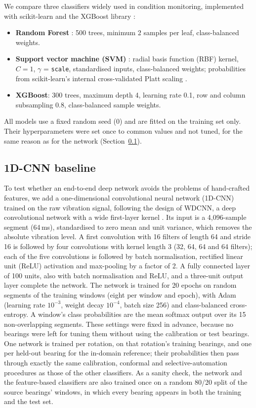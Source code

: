We compare three classifiers widely used in condition monitoring, implemented with scikit-learn
\citep{pedregosa2011} and the XGBoost library \citep{chen2016}:
\begin{itemize}[nosep]
  \item \textbf{Random Forest} \citep{breiman2001}: 500 trees, minimum 2 samples per leaf, class-balanced weights.
  \item \textbf{Support vector machine (SVM)} \citep{cortes1995}: radial basis function (RBF) kernel, $C = 1$, $\gamma$ = \texttt{scale},
        standardised inputs, class-balanced weights; probabilities from scikit-learn's internal cross-validated
        Platt scaling \citep{platt1999}.
  \item \textbf{XGBoost}: 300 trees, maximum depth 4, learning rate 0.1, row and column subsampling 0.8,
        class-balanced sample weights.
\end{itemize}
All models use a fixed random seed (0) and are fitted on the training set only. Their hyperparameters were set once to
common values and not tuned, for the same reason as for the network (Section~\ref{sec:cnn}).

\subsection{1D-CNN baseline}
\label{sec:cnn}

To test whether an end-to-end deep network avoids the problems of hand-crafted features, we add a one-dimensional
convolutional neural network (1D-CNN) trained on the raw vibration signal, following the design of WDCNN, a deep
convolutional network with a wide first-layer kernel \citep{zhang2017}. Its input is a 4{,}096-sample segment (64\,ms), standardised to zero mean and unit variance,
which removes the absolute vibration level. A first convolution with 16 filters of length 64 and stride 16 is
followed by four convolutions with kernel length 3 (32, 64, 64 and 64 filters); each of the five convolutions is
followed by batch normalisation, rectified linear unit (ReLU) activation and max-pooling by a factor of 2. A fully
connected layer of 100 units, also with batch normalisation and ReLU, and a three-unit output layer complete the
network. The network is trained for
20 epochs on random segments of the training windows (eight per window and epoch), with Adam (learning rate
$10^{-3}$, weight decay $10^{-4}$, batch size 256) and class-balanced cross-entropy. A window's class probabilities
are the mean softmax output over its 15 non-overlapping segments. These settings were fixed in advance, because no
bearings were left for tuning them without using the calibration or test bearings. One network is trained per
rotation, on that rotation's training bearings, and one per held-out bearing for the in-domain reference; their
probabilities then pass through exactly the same calibration, conformal and selective-automation procedures as those
of the other classifiers. As a sanity check, the network and the feature-based classifiers are also trained once on a
random 80/20 split of the source bearings' windows, in which every bearing appears in both the training and the test
set.


